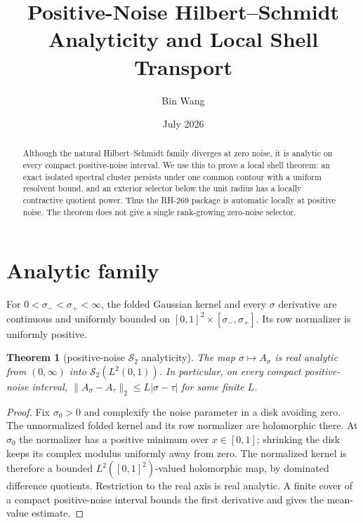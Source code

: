 \documentclass[11pt]{article}
\title{Positive-Noise Hilbert--Schmidt Analyticity and Local Shell Transport}\author{Bin Wang}\date{July 2026}
\newtheorem{theorem}{Theorem}[section]\newtheorem{corollary}[theorem]{Corollary}
\theoremstyle{remark}\newtheorem{remark}[theorem]{Remark}
\begin{document}
\maketitle
\begin{abstract}
Although the natural Hilbert--Schmidt family diverges at zero noise, it is
analytic on every compact positive-noise interval.  We use this to prove a
local shell theorem: an exact isolated spectral cluster persists under one
common contour with a uniform resolvent bound, and an exterior selector below
the unit radius has a locally contractive quotient power.  Thus the RH-269
package is automatic locally at positive noise.  The theorem does not give a
single rank-growing zero-noise selector.
\end{abstract}
\section{Analytic family}
For $0<\sigma_-<\sigma_+<\infty$, the folded Gaussian kernel and every
$\sigma$ derivative are continuous and uniformly bounded on
$[0,1]^2\times[\sigma_-,\sigma_+]$.  Its row normalizer is uniformly positive.
\begin{theorem}[positive-noise $\mathcal S_2$ analyticity]
The map $\sigma\mapsto A_\sigma$ is real analytic from $(0,\infty)$ into
$\mathcal S_2(L^2(0,1))$.  In particular, on every compact positive-noise
interval, $\|A_\sigma-A_\tau\|_2\le L|\sigma-\tau|$ for some finite $L$.
\end{theorem}
\begin{proof}
Fix $\sigma_0>0$ and complexify the noise parameter in a disk avoiding zero.
The unnormalized folded kernel and its row normalizer are holomorphic there.
At $\sigma_0$ the normalizer has a positive minimum over $x\in[0,1]$;
shrinking the disk keeps its complex modulus uniformly away from zero.
The normalized kernel is therefore a bounded $L^2([0,1]^2)$-valued
holomorphic map, by dominated difference quotients.  Restriction to the real
axis is real analytic.  A finite cover of a compact positive-noise interval
bounds the first derivative and gives the mean-value estimate.
\end{proof}
\end{document}
